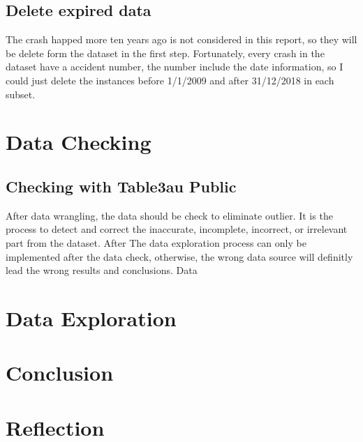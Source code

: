 \documentclass[11pt]{article}
\theoremstyle{definition}
\begin{document}
\subsection{Delete expired data}
The crash happed more ten years ago is not considered in this report, so they will be delete form the dataset in the first step. Fortunately, every crash in the dataset have a accident number, the number include the date information, so I could just delete the instances before 1/1/2009 and after 31/12/2018 in each subset.  

\section{Data Checking}
\label{dataChecking}
\subsection{Checking with Table3au Public}
After data wrangling, the data should be check to eliminate outlier. It is the process to detect and correct the inaccurate, incomplete, incorrect, or irrelevant part from the dataset. After 
The data exploration process can only be implemented after the data check, otherwise, the wrong data source will definitly lead the wrong results and conclusions. Data 

\section{Data Exploration}
\label{dataExploration}


\section{Conclusion}

\section{Reflection}
\end{document}
